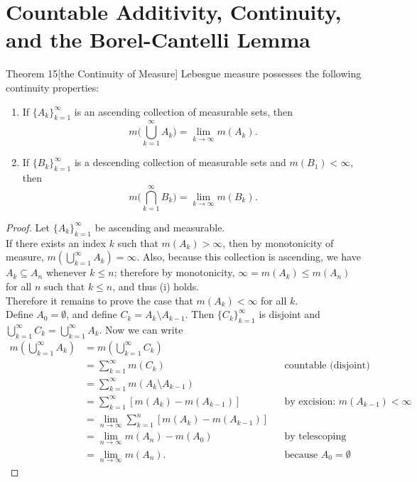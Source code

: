 \section{Countable Additivity, Continuity, and the Borel-Cantelli Lemma}
\begin{flushleft}
	\begin{namedthm*}{Theorem 15}[the Continuity of Measure]
		Lebesgue measure possesses the following continuity properties:
		\begin{enumerate}[label=(\roman*),align=left]
			\item If $\{A_k\}_{k=1}^\infty$ is an ascending collection of measurable sets, then
			\[
				m\biggl(\bigcup_{k=1}^\infty A_k\biggr)=\lim_{k\to\infty}m(A_k).
			\]
			\item If $\{B_k\}_{k=1}^\infty$ is a descending collection of measurable sets and $m(B_1)<\infty$, then
			\[
				m\biggl(\bigcap_{k=1}^\infty B_k\biggr)=\lim_{k\to\infty}m(B_k).
			\]
		\end{enumerate}
	\end{namedthm*}
	\begin{proof}
		Let $\{A_k\}_{k=1}^\infty$ be ascending and measurable.\\
		If there exists an index $k$ such that $m(A_k)>\infty$, then by monotonicity of measure, $m(\bigcup_{k=1}^\infty A_k)=\infty$.
		Also, because this collection is ascending, we have $A_k\subseteq A_n$ whenever $k\le n$; therefore by monotonicity, $\infty=m(A_k)\le m(A_n)$ for all $n$ such that $k\le n$, and thus (i) holds.\\
		Therefore it remains to prove the case that $m(A_k)<\infty$ for all $k$.\\
		Define $A_0=\emptyset$, and define $C_k=A_k\setminus A_{k-1}$. Then $\{C_k\}_{k=1}^\infty$ is disjoint and $\bigcup_{k=1}^\infty C_k=\bigcup_{k=1}^\infty A_k$.
		Now we can write
		\begin{align*}
			m(\bigcup_{k=1}^\infty A_k)&=m(\bigcup_{k=1}^\infty C_k)\\
			&=\sum_{k=1}^\infty m(C_k)&&\text{countable (disjoint) monotonicity}\\
			&=\sum_{k=1}^\infty m(A_k\setminus A_{k-1})\\
			&=\sum_{k=1}^\infty [m(A_k)-m(A_{k-1})]&&\text{by excision: }m(A_{k-1})<\infty\\
			&=\lim_{n\to\infty}\sum_{k=1}^n [m(A_k)-m(A_{k-1})]\\
			&=\lim_{n\to\infty}m(A_n)-m(A_0)&&\text{by telescoping}\\
			&=\lim_{n\to\infty}m(A_n).&&\text{because }A_0=\emptyset

\end{align*}
\end{proof}
\end{flushleft}
